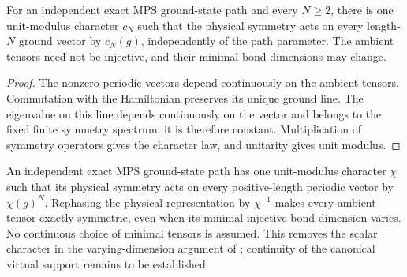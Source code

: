 \begin{lemma}
    \label{thm:spt_physical_path_chain_character}
    \leanok
    For an independent exact MPS ground-state path and every $N\ge2$,
    there is one unit-modulus character $c_N$ such that the physical
    symmetry acts on every length-$N$ ground vector by $c_N(g)$,
    independently of the path parameter. The ambient tensors need not
    be injective, and their minimal bond dimensions may change.
\end{lemma}

\begin{proof}\leanok
    The nonzero periodic vectors depend continuously on the ambient tensors.
    Commutation with the Hamiltonian preserves its unique ground line.
    The eigenvalue on this line depends continuously on the vector and
    belongs to the fixed finite symmetry spectrum; it is therefore
    constant. Multiplication of symmetry operators gives the character
    law, and unitarity gives unit modulus.
\end{proof}

\begin{lemma}
    \label{thm:spt_varying_bond_physical_character}
    \leanok

    An independent exact MPS ground-state path has one unit-modulus
    character $\chi$ such that its physical symmetry acts on every
    positive-length periodic vector by $\chi(g)^N$. Rephasing the physical
    representation by $\chi^{-1}$ makes every ambient tensor exactly
    symmetric, even when its minimal injective bond dimension varies.
    No continuous choice of minimal tensors is assumed.
    This removes the scalar character in the varying-dimension argument
    of \cite[Appendices~B and~C]{Schuch2011Phases}; continuity of the
    canonical virtual support remains to be established.
\end{lemma}


